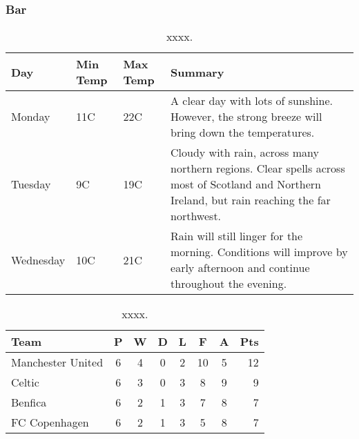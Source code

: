 \documentclass[tcc2]{uftex}
\begin{document}
\subsubsection{Bar}

\lipsum[11] \cite{fowler04:designDead}

\begin{table}[!htpb]
\centering
\caption{xxxx.}\label{tab:tab1}
   \begin{tabular}{ | l | l | l | p{5cm} |}
    \hline
    Day & Min Temp & Max Temp & Summary \\ \hline
    Monday & 11C & 22C & A clear day with lots of sunshine.  
    However, the strong breeze will bring down the temperatures. \\ \hline
    Tuesday & 9C & 19C & Cloudy with rain, across many northern regions. Clear spells 
    across most of Scotland and Northern Ireland, 
    but rain reaching the far northwest. \\ \hline
    Wednesday & 10C & 21C & Rain will still linger for the morning. 
    Conditions will improve by early afternoon and continue 
    throughout the evening. \\
    \hline
    \end{tabular}
\end{table}

\lipsum[12] \cite{FSF:GNU-GPL}

\begin{table}[!htpb]
\centering
\caption{xxxx.}\label{tab:tab1}
\begin{tabular}{l*{6}{c}r}
Team              & P & W & D & L & F  & A & Pts \\
\hline
Manchester United & 6 & 4 & 0 & 2 & 10 & 5 & 12  \\
Celtic            & 6 & 3 & 0 & 3 &  8 & 9 &  9  \\
Benfica           & 6 & 2 & 1 & 3 &  7 & 8 &  7  \\
FC Copenhagen     & 6 & 2 & 1 & 3 &  5 & 8 &  7  \\
\end{tabular}
\end{table}

\lipsum[13] \cite{eco:09}
\end{document}
